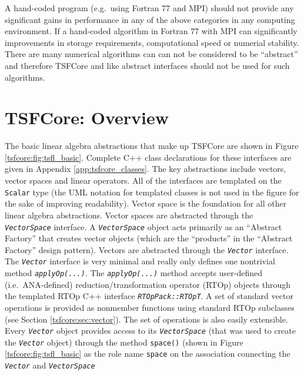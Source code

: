 A hand-coded program (e.g.~using Fortran 77 and MPI) should not
provide any significant gains in performance in any of the above
categories in any computing environment.  If a hand-coded algorithm in
Fortran 77 with MPI can significantly improvements in storage
requirements, computational speed or numerial stability.  There are
many numerical algorithms can can not be considered to be ``abstract''
and therefore TSFCore and like abstract interfaces should not be used
for such algorithms.

%
\section{TSFCore: Overview}
\label{tsfcore:sec:TSFCore_core_overview}
%

The basic linear algebra abstractions that make up TSFCore are shown
in Figure {}\ref{tsfcore:fig:tsfl_basic}.  Complete C++ class
declarations for these interfaces are given in Appendix
{}\ref{app:tsfcore_classes}.  The key abstractions include vectors,
vector spaces and linear operators.  All of the interfaces are
templated on the {}\texttt{Scalar} type (the UML notation for
templated classes is not used in the figure for the sake of improving
readability).  Vector space is the foundation for all other linear
algebra abstractions.  Vector spaces are abstracted through the
{}\texttt{\textit{VectorSpace}} interface.  A
{}\texttt{\textit{VectorSpace}} object acts primarily as an ``Abstract
Factory'' {}\cite{ref:gama_et_al_1995} that creates vector objects
(which are the ``products'' in the ``Abstract Factory'' design
pattern).  Vectors are abstracted through the
{}\texttt{\textit{Vector}} interface.  The {}\texttt{\textit{Vector}}
interface is very minimal and really only defines one nontrivial
method {}\texttt{\textit{applyOp(\-...)}}.  The
{}\texttt{\textit{applyOp(\-...)}} method accepts user-defined
(i.e.~ANA-defined) reduction/transformation operator (RTOp) objects
through the templated RTOp C++ interface
{}\texttt{\textit{RTOpPack::RTOpT}}.  A set of standard vector
operations is provided as nonmember functions using standard RTOp
subclasses (see Section {}\ref{tsfcore:sec:vector}).  The set of
operations is also easily extensible.  Every
{}\texttt{\textit{Vector}} object provides access to its
{}\texttt{\textit{VectorSpace}} (that was used to create the
{}\texttt{\textit{Vector}} object) through the method
{}\texttt{space()} (shown in Figure {}\ref{tsfcore:fig:tsfl_basic} as
the role name {}\texttt{space} on the association connecting the
{}\texttt{\textit{Vector}} and {}\texttt{\textit{VectorSpace}}
